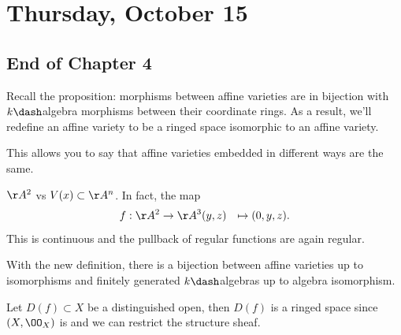\hypertarget{thursday-october-15}{%
\section{Thursday, October 15}\label{thursday-october-15}}

\hypertarget{end-of-chapter-4}{%
\subsection{End of Chapter 4}\label{end-of-chapter-4}}

Recall the proposition: morphisms between affine varieties are in
bijection with \(k\dash\)algebra morphisms between their coordinate
rings. As a result, we'll redefine an affine variety to be a ringed
space isomorphic to an affine variety.

This allows you to say that affine varieties embedded in different ways
are the same.

\begin{example}

\(\AA^2\) vs \(V(x) \subset \AA^n\). In fact, the map
\begin{align*}  
f: \AA^2 &\to \AA^3
(y,z) &\mapsto (0, y, z)
.\end{align*} This is continuous and the pullback of regular functions
are again regular.

\end{example}

\begin{remark}

With the new definition, there is a bijection between affine varieties
up to isomorphisms and finitely generated \(k\dash\)algebras up to
algebra isomorphism.

\end{remark}

\begin{proposition}[?]

Let \(D(f) \subset X\) be a distinguished open, then \(D(f)\) is a
ringed space since \((X, \OO_X)\) is and we can restrict the structure
sheaf.

\end{proposition}

